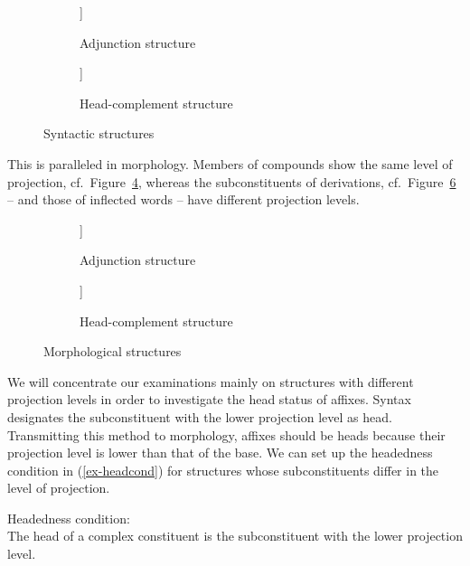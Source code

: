 \documentclass[output=paper
  ,nobabel
  ,draftmode
  ,colorlinks, citecolor=brown
]{langscibook}
\begin{document}
\begin{figure}
\begin{subfigure}{.48\textwidth}
\centering	
\begin{forest}
	[XP
		[YP]
		[XP]
	]
\end{forest}
\caption{Adjunction structure}\label{ex-adj-str}
\end{subfigure}
\begin{subfigure}{.48\textwidth}
\centering
\begin{forest}
	[XP
		[YP]
		[X]
	]
\end{forest}
\caption{Head-complement structure}\label{ex-hc-str}
\end{subfigure}
\caption{Syntactic structures}\label{ex-adj-hc-str}
\end{figure}

This is paralleled in morphology. Members of compounds show the same level of projection, cf.\ Figure~\ref{ex-samepro}, whereas the subconstituents of derivations, cf.\ Figure~\ref{ex-diffpro} – and those of inflected words – have different projection levels.

\begin{figure}
\begin{subfigure}{.48\textwidth}
\centering
\begin{forest}
	[X
		[X]
		[Y]
	]
\end{forest}
\caption{Adjunction structure}\label{ex-samepro}
\end{subfigure}
\begin{subfigure}{.48\textwidth}
\centering
\begin{forest}
	[X
		[Y]
		[X$^{\textnormal{af}}$]
	]
\end{forest}
\caption{Head-complement structure}\label{ex-diffpro}
\end{subfigure}
\caption{Morphological structures}
\end{figure}


We will concentrate our examinations mainly on structures with different projection levels in order to investigate the head status of affixes. Syntax designates the subconstituent with the lower projection level as head. Transmitting this method to morphology, affixes should be heads because their projection level is lower than that of the base. We can set up the headedness condition in (\ref{ex-headcond}) for structures whose subconstituents differ in the level of projection.

\ea\label{ex-headcond}
Headedness condition: \\ 
The head of a complex constituent is the subconstituent with 	the lower projection level.
\z
\end{document}
